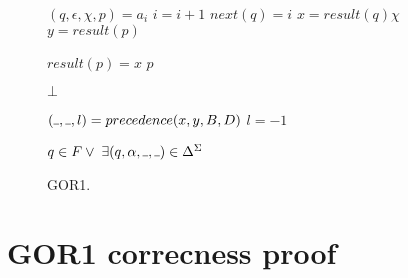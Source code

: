 \documentclass[AMA,STIX1COL]{WileyNJD-v2}
\newcommand{\Xund}{\rule{.4em}{.4pt}}
\begin{document}
\begin{figure*}
\begin{multicols}{2}
\begin{algorithm}[H]
{        %
         {

            $(q, \epsilon, \chi, p) = a_i$ \;
            $i = i + 1$ \;
            $next(q) = i$ \;
            $x = result(q) \chi$ \;
            $y = result(p)$ \;

             {
                $result(p) = x$ \;
                \Return $p$ \;
            }
        }

        \Return $\bot$ \;
    }
    \end{algorithm}


    \begin{algorithm}[H] \DontPrintSemicolon {} 
     {
        $(\Xund, \Xund, l) = precedence (x, y, B, D)$ \;
        \Return $l = -1$ \;
    }
    \end{algorithm}

    \begin{algorithm}[H] \DontPrintSemicolon {} 
     {
        \Return $q \in F \vee \; \exists (q, \alpha, \Xund, \Xund) \in \Delta^\Sigma$ \;
    }
    \end{algorithm}


\end{multicols}
\begin{center}
\caption{GOR1.}
\end{center}
\end{figure*}


\clearpage
\pagebreak

\section{GOR1 correcness proof}
\end{document}
